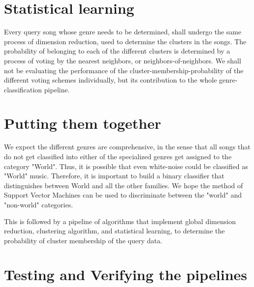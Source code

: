 \documentclass[12pt]{article}
\begin{document}
\section{Statistical learning}
Every query song whose genre needs to be determined, shall undergo the same process of dimension reduction, used to determine the clusters in the songs. The probability of belonging to each of the different clusters is determined by a process of voting by the nearest neighbors, or neighbors-of-neighbors. We shall not be evaluating the performance of the cluster-membership-probability of the different voting schemes individually, but its contribution to the whole genre-classification pipeline. 

\section{Putting them together}

We expect the different genres are comprehensive, in the sense that all songs that do not get classified into either of the specialized genres get assigned to the category "World". Thus, it is possible that even white-noise could be classified as "World" music. Therefore, it is important to build a binary classifier that distinguishes between World and all the other families. We hope the method of Support Vector Machines can be used to discriminate between the "world" and "non-world" categories. 

This is followed by a pipeline of algorithms that implement global dimension reduction, clustering algorithm, and statistical learning, to determine the probability of cluster membership of the query data. 

\section{Testing and Verifying the pipelines}
\end{document}
